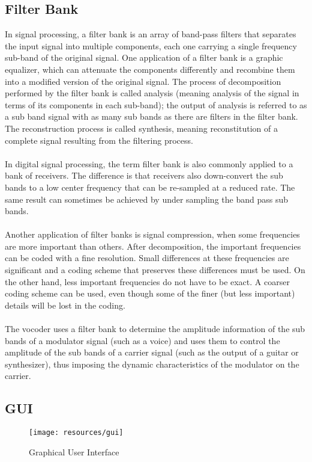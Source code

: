 \subsection{Filter Bank}
In signal processing, a filter bank is an array of band-pass filters that separates the input
signal into multiple components, each one carrying a single frequency sub-band of the
original signal. One application of a filter bank is a graphic equalizer, which can attenuate the
components differently and recombine them into a modified version of the original signal.
The process of decomposition performed by the filter bank is called analysis (meaning
analysis of the signal in terms of its components in each sub-band); the output of analysis is
referred to as a sub band signal with as many sub bands as there are filters in the filter bank.
The reconstruction process is called synthesis, meaning reconstitution of a complete signal
resulting from the filtering process.\\
\\
In digital signal processing, the term filter bank is also commonly applied to a bank of
receivers. The difference is that receivers also down-convert the sub bands to a low center
frequency that can be re-sampled at a reduced rate. The same result can sometimes be
achieved by under sampling the band pass sub bands.\\
\\
Another application of filter banks is signal compression, when some frequencies are more
important than others. After decomposition, the important frequencies can be coded with a
fine resolution. Small differences at these frequencies are significant and a coding scheme
that preserves these differences must be used. On the other hand, less important frequencies
do not have to be exact. A coarser coding scheme can be used, even though some of the finer
(but less important) details will be lost in the coding.\\
\\
The vocoder uses a filter bank to determine the amplitude information of the sub bands of a
modulator signal (such as a voice) and uses them to control the amplitude of the sub bands of
a carrier signal (such as the output of a guitar or synthesizer), thus imposing the dynamic
characteristics of the modulator on the carrier.\\

\newpage
\subsection{GUI}
\begin{figure}[h!]
        \texttt{[image: resources/gui]}
        \caption{Graphical User Interface}
\end{figure}
